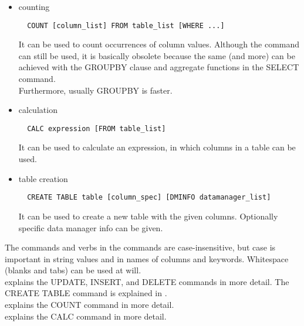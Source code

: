 \begin{itemize}
\item counting
\begin{verbatim}
  COUNT [column_list] FROM table_list [WHERE ...]
\end{verbatim}
It can be used to count occurrences of column values. Although the
command can still be used, it is basically
obsolete because the same (and more) can be achieved with the GROUPBY
clause and aggregate functions in the SELECT command.
\\Furthermore, usually GROUPBY is faster.

\item calculation
\begin{verbatim}
  CALC expression [FROM table_list]
\end{verbatim}
It can be used to calculate an expression, in which columns
in a table can be used.

\item table creation
\begin{verbatim}
  CREATE TABLE table [column_spec] [DMINFO datamanager_list]
\end{verbatim}
It can be used to create a new table with the given columns.
Optionally specific data manager info can be given.

\end{itemize}
The commands and verbs in the commands are
case-insensitive, but case is important in string values and
in names of columns and keywords. Whitespace (blanks and tabs) can
be used at will.
\\ explains the
UPDATE, INSERT, and DELETE commands in more detail. The CREATE TABLE command is
explained in .
\\
explains the COUNT command in more detail.
\\
explains the CALC command in more detail.

